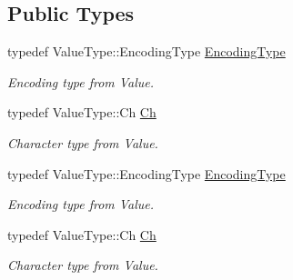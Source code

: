 \subsection*{Public Types}
\begin{DoxyCompactItemize}
\item 
typedef Value\+Type\+::\+Encoding\+Type \hyperlink{class_generic_pointer_a4b802da797a7a0b615fd9611cedb7c3b}{Encoding\+Type}\hypertarget{class_generic_pointer_a4b802da797a7a0b615fd9611cedb7c3b}{}\label{class_generic_pointer_a4b802da797a7a0b615fd9611cedb7c3b}

\begin{DoxyCompactList}\small\item\em Encoding type from Value. \end{DoxyCompactList}\item 
typedef Value\+Type\+::\+Ch \hyperlink{class_generic_pointer_ab292356c11b4015c98d21b966b11f285}{Ch}\hypertarget{class_generic_pointer_ab292356c11b4015c98d21b966b11f285}{}\label{class_generic_pointer_ab292356c11b4015c98d21b966b11f285}

\begin{DoxyCompactList}\small\item\em Character type from Value. \end{DoxyCompactList}\item 
typedef Value\+Type\+::\+Encoding\+Type \hyperlink{class_generic_pointer_a4b802da797a7a0b615fd9611cedb7c3b}{Encoding\+Type}\hypertarget{class_generic_pointer_a4b802da797a7a0b615fd9611cedb7c3b}{}\label{class_generic_pointer_a4b802da797a7a0b615fd9611cedb7c3b}

\begin{DoxyCompactList}\small\item\em Encoding type from Value. \end{DoxyCompactList}\item 
typedef Value\+Type\+::\+Ch \hyperlink{class_generic_pointer_ab292356c11b4015c98d21b966b11f285}{Ch}\hypertarget{class_generic_pointer_ab292356c11b4015c98d21b966b11f285}{}\label{class_generic_pointer_ab292356c11b4015c98d21b966b11f285}

\begin{DoxyCompactList}\small\item\em Character type from Value. \end{DoxyCompactList}\end{DoxyCompactItemize}
